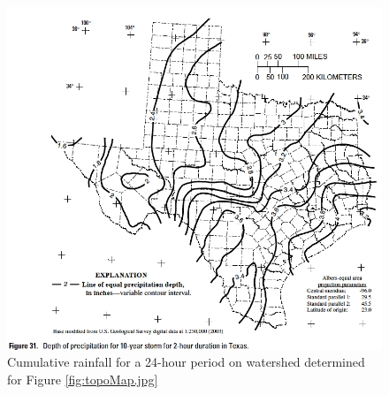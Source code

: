 \documentclass[12pt]{article}
\begin{document}
\begin{enumerate}
\begin{figure}[h!] %
   \centering
   \includegraphics[width=6in]{DDF-Atlas-10yr.jpg} 
   \caption{Cumulative rainfall for a 24-hour period on watershed determined for Figure \ref{fig:topoMap.jpg}}
   \label{fig:DDF-Atlas-10yr}
\end{figure}

%
%
%
%
%
%
%
%
\end{enumerate}
\end{document}
